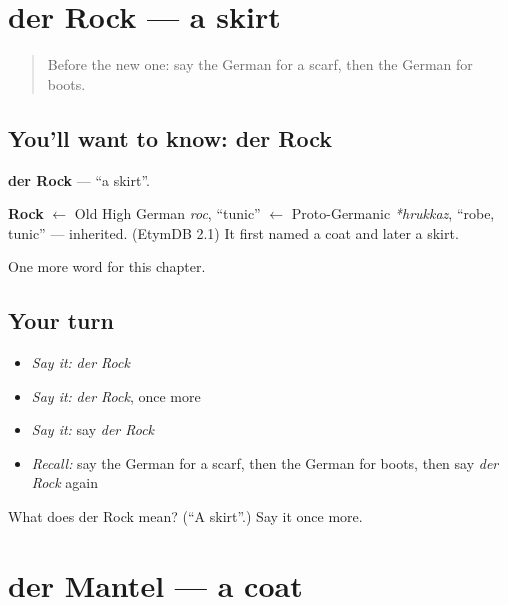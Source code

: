 \section[der Rock]{der Rock — a skirt}

\label{lesson:GE-C119-rock}



\begin{quote}
Before the new one: say the German for a scarf, then the German for boots.
\end{quote}

\subsection*{You'll want to know: der Rock}
\textbf{der Rock} — \textquotedblleft{}a skirt\textquotedblright{}.

\begin{cousinweb}
\textbf{Rock} $\leftarrow$ Old High German \emph{roc}, \textquotedblleft{}tunic\textquotedblright{} $\leftarrow$ Proto-Germanic \emph{*hrukkaz}, \textquotedblleft{}robe, tunic\textquotedblright{} — inherited. (EtymDB 2.1) It first named a coat and later a skirt.
\end{cousinweb}

\begin{grammarlens}[title={What you've built}]
One more word for this chapter.
\end{grammarlens}

\subsection*{Your turn}
\begin{itemize}
\raggedright
  \item \emph{Say it:} \emph{der Rock}
  \item \emph{Say it:} \emph{der Rock}, once more
  \item \emph{Say it:} say \emph{der Rock}
  \item \emph{Recall:} say the German for a scarf, then the German for boots, then say \emph{der Rock} again
\end{itemize}

\begin{tcolorbox}[breakable,colback=teal!4,colframe=teal!35!black,title={Before you move on}]
What does der Rock mean? (\textquotedblleft{}A skirt\textquotedblright{}.) Say it once more.
\end{tcolorbox}
\section[der Mantel]{der Mantel — a coat}

